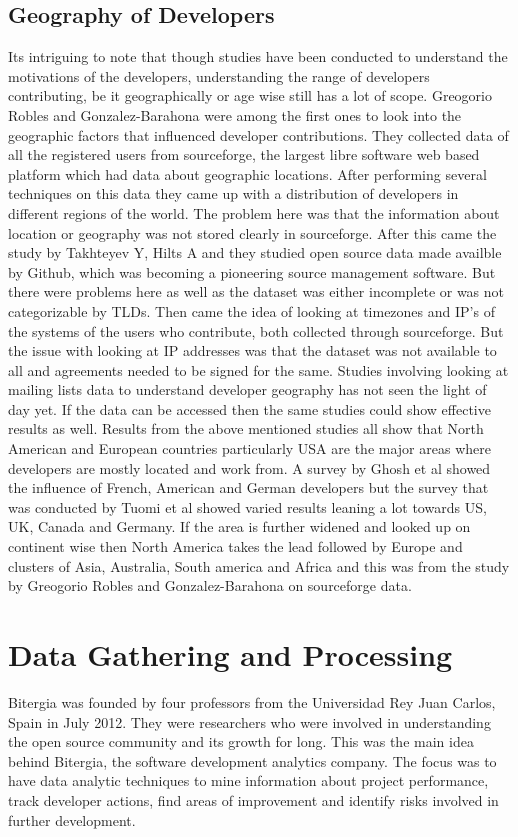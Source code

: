 \documentclass[seploa]{beavtex}
\begin{document}
\section{Geography of Developers}
Its intriguing to note that though studies have been conducted to understand the motivations of the developers, understanding the range of developers contributing, be it geographically or age wise still has a lot of scope. Greogorio Robles and Gonzalez-Barahona were among the first ones to look into the geographic factors that influenced developer contributions. They collected data of all the registered users from sourceforge, the largest libre software web based platform which had data about geographic locations. After performing several techniques on this data they came up with a distribution of developers in different regions of the world\cite{robles2006}. The problem here was that the information about location or geography was not stored clearly in sourceforge. After this came the study by Takhteyev Y, Hilts A and they studied open source data made availble by Github, which was becoming a pioneering source management software. But there were problems here as well as the dataset was either incomplete or was not categorizable by TLDs\cite{yuri2010}. Then came the idea of looking at timezones and IP's of the systems of the users who contribute, both collected through sourceforge. But the issue with looking at IP addresses was that the dataset was not available to all and agreements needed to be signed for the same\cite{von2010}. Studies involving looking at mailing lists data to understand developer geography has not seen the light of day yet. If the data can be accessed then the same studies could show effective results as well. Results from the above mentioned studies all show that North American and European countries particularly USA are the major areas where developers are mostly located and work from. A survey by Ghosh et al\cite{ghosh2005} showed the influence of French, American and German developers but the survey that was conducted by Tuomi et al\cite{tuomi2004} showed varied results leaning a lot towards US, UK, Canada and Germany. If the area is further widened and looked up on continent wise then North America takes the lead followed by Europe and clusters of Asia, Australia, South america and Africa and this was from the study by Greogorio Robles and Gonzalez-Barahona on sourceforge data\cite{robles2006}.

\chapter{Data Gathering and Processing}
Bitergia was founded by four professors from the 	
Universidad Rey Juan Carlos, Spain in July 2012\cite{bit}. They were researchers who were involved in understanding the open source community and its growth for long. This was the main idea behind Bitergia, the software development analytics company. The focus was to have data analytic techniques to mine information about project performance, track developer actions, find areas of improvement and identify risks involved in further development. 
\end{document}
